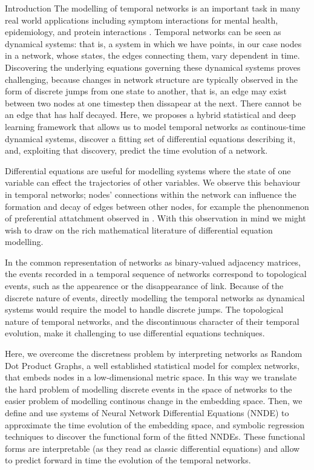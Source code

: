 \documentclass[12pt]{amsart}
\begin{document}
\begin{section}{Introduction}
The modelling of temporal networks is an important task in many real world applications including symptom interactions for mental health, epidemiology, and protein interactions \cite{jordan2020current,contreras2020temporal,lucas2021inferring,jin2009identifying,masuda2013predicting}.
Temporal networks can be seen as dynamical systems: that is, a system in which we have points, in our case nodes in a network, whose states, the edges connecting them, vary dependent in time.
Discovering the underlying equations governing these dynamical systems proves challenging, because changes in network structure are typically observed in the form of discrete jumps from one state to another, that is, an edge may exist between two nodes at one timestep then dissapear at the next. There cannot be an edge that has half decayed.
Here, we proposes a hybrid statistical and deep learning framework that allows us to model temporal networks as continous-time dynamical systems, discover a fitting set of differential equations describing it, and, exploiting that discovery, predict the time evolution of a network.

Differential equations are useful for modelling systems where the state of one variable can effect the trajectories of other variables. We observe this behaviour in temporal networks; nodes' connections within the network can influence the formation and decay of edges between other nodes, for example the phenonmenon of preferential attatchment observed in \cite{newman2001clustering,capocci2006preferential}. With this observation in mind we might wish to draw on the rich mathematical literature of differential equation modelling.

In the common representation of networks as binary-valued adjacency matrices, the events recorded in a temporal sequence of networks correspond to topological events, such as the appearence or the disappearance of link.
Because of the discrete nature of events, directly modelling the temporal networks as dynamical systems would require the model to handle discrete jumps.
The topological nature of temporal networks, and the discontinuous character of their temporal evolution, make it challenging to use differential equations techniques.

Here, we overcome the discretness problem by interpreting networks as Random Dot Product Graphs, a well established statistical model for complex networks, that embeds nodes in a low-dimensional metric space\cite{athreya2017statistical}. In this way we translate the hard problem of modelling discrete events in the space of networks to the easier problem of modelling continous change in the embedding space. Then, we define and use systems of Neural Network Differential Equations (NNDE) to approximate the time evolution of the embedding space, and symbolic regression techniques to discover the functional form of the fitted NNDEs. These functional forms are interpretable (as they read as classic differential equations) and allow to predict forward in time the evolution of the temporal networks.


\end{section}
\end{document}

